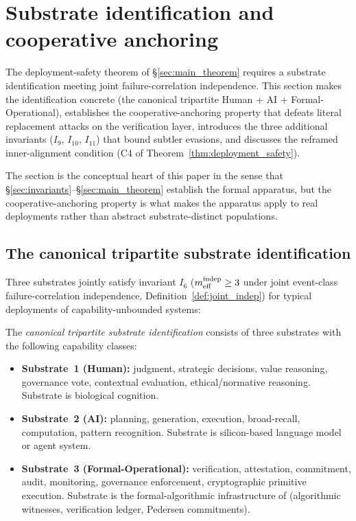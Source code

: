 \section{Substrate identification and cooperative anchoring}
\label{sec:substrate_anchoring}

The deployment-safety theorem of \S\ref{sec:main_theorem} requires
a substrate identification meeting joint failure-correlation
independence. This section makes the identification concrete (the
canonical tripartite Human + AI + Formal-Operational), establishes
the cooperative-anchoring property that defeats literal replacement
attacks on the verification layer, introduces the three additional
invariants ($I_9$, $I_{10}$, $I_{11}$) that bound subtler
evasions, and discusses the reframed inner-alignment condition
(C4 of Theorem~\ref{thm:deployment_safety}).

The section is the conceptual heart of this paper in the sense that
\S\ref{sec:invariants}--\S\ref{sec:main_theorem} establish the
formal apparatus, but the cooperative-anchoring property is what
makes the apparatus apply to real deployments rather than abstract
substrate-distinct populations.

\subsection{The canonical tripartite substrate identification}
\label{sec:tripartite}

Three substrates jointly satisfy invariant $I_6$ ($m_{\mathrm{eff}}^{\mathrm{indep}} \geq 3$
under joint event-class failure-correlation independence,
Definition~\ref{def:joint_indep}) for typical deployments of
capability-unbounded systems:

\begin{definition}
\label{def:tripartite}
The \emph{canonical tripartite substrate identification} consists
of three substrates with the following capability classes:
\begin{itemize}
\item \textbf{Substrate~1 (Human):} judgment, strategic decisions,
  value reasoning, governance vote, contextual evaluation,
  ethical/normative reasoning. Substrate is biological cognition.
\item \textbf{Substrate~2 (AI):} planning, generation, execution,
  broad-recall, computation, pattern recognition. Substrate is
  silicon-based language model or agent system.
\item \textbf{Substrate~3 (Formal-Operational):} verification, attestation,
    commitment, audit, monitoring, governance enforcement, cryptographic
    primitive execution. Substrate is the formal-algorithmic infrastructure
    of \citep{lasser2026exo} (algorithmic witnesses, verification ledger,
    Pedersen commitments).
\end{itemize}
\end{definition}

